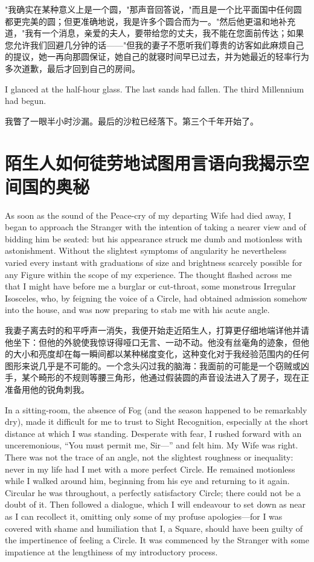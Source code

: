 \documentclass[12pt,UTF8]{ctexbook}
\begin{document}
"我确实在某种意义上是一个圆，"那声音回答说，"而且是一个比平面国中任何圆都更完美的圆；但更准确地说，我是许多个圆合而为一。"然后他更温和地补充道，"我有一个消息，亲爱的夫人，要带给您的丈夫，我不能在您面前传达；如果您允许我们回避几分钟的话——"但我的妻子不愿听我们尊贵的访客如此麻烦自己的提议，她一再向那圆保证，她自己的就寝时间早已过去，并为她最近的轻率行为多次道歉，最后才回到自己的房间。

I glanced at the half-hour glass. The last sands had fallen. The third Millennium had begun.

我瞥了一眼半小时沙漏。最后的沙粒已经落下。第三个千年开始了。

\chapter{陌生人如何徒劳地试图用言语向我揭示空间国的奥秘}

As soon as the sound of the Peace-cry of my departing Wife had died away, I began to approach the Stranger with the intention of taking a nearer view and of bidding him be seated: but his appearance struck me dumb and motionless with astonishment. Without the slightest symptoms of angularity he nevertheless varied every instant with graduations of size and brightness scarcely possible for any Figure within the scope of my experience. The thought flashed across me that I might have before me a burglar or cut-throat, some monstrous Irregular Isosceles, who, by feigning the voice of a Circle, had obtained admission somehow into the house, and was now preparing to stab me with his acute angle.

我妻子离去时的和平呼声一消失，我便开始走近陌生人，打算更仔细地端详他并请他坐下：但他的外貌使我惊讶得哑口无言、一动不动。他没有丝毫角的迹象，但他的大小和亮度却在每一瞬间都以某种梯度变化，这种变化对于我经验范围内的任何图形来说几乎是不可能的。一个念头闪过我的脑海：我面前的可能是一个窃贼或凶手，某个畸形的不规则等腰三角形，他通过假装圆的声音设法进入了房子，现在正准备用他的锐角刺我。

In a sitting-room, the absence of Fog (and the season happened to be remarkably dry), made it difficult for me to trust to Sight Recognition, especially at the short distance at which I was standing. Desperate with fear, I rushed forward with an unceremonious, ``You must permit me, Sir---'' and felt him. My Wife was right. There was not the trace of an angle, not the slightest roughness or inequality: never in my life had I met with a more perfect Circle. He remained motionless while I walked around him, beginning from his eye and returning to it again. Circular he was throughout, a perfectly satisfactory Circle; there could not be a doubt of it. Then followed a dialogue, which I will endeavour to set down as near as I can recollect it, omitting only some of my profuse apologies---for I was covered with shame and humiliation that I, a Square, should have been guilty of the impertinence of feeling a Circle. It was commenced by the Stranger with some impatience at the lengthiness of my introductory process.
\end{document}
